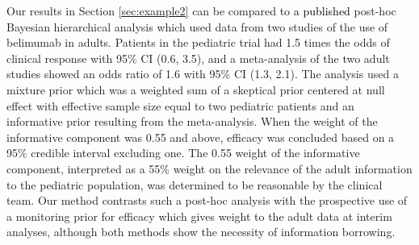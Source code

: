 \documentclass[12pt]{article}
\begin{document}
Our results in Section \ref{sec:example2} can be compared to \textcolor{black}{a published} post-hoc Bayesian hierarchical analysis \citep{Brunner2020} which used data from two studies of the use of belimumab in adults. Patients in the pediatric trial had 1.5 times the odds of clinical response with 95\% CI (0.6, 3.5), and a meta-analysis of the two adult studies showed an odds ratio of 1.6 with 95\% CI (1.3, 2.1). The analysis used a mixture prior which was a weighted sum of a skeptical prior centered at null effect with effective sample size equal to two pediatric patients and an informative prior resulting from the meta-analysis. When the weight of the informative component was 0.55 and above, efficacy was concluded based on a 95\% credible interval excluding one. The 0.55 weight of the informative component, interpreted as a 55\% weight on the relevance of the adult information to the pediatric population, was determined to be reasonable by the clinical team. Our method contrasts such a post-hoc analysis with the prospective use of a monitoring prior for efficacy which gives weight to the adult data at interim analyses, although both methods show the necessity of information borrowing. %


%
%
%
%
%
\end{document}
